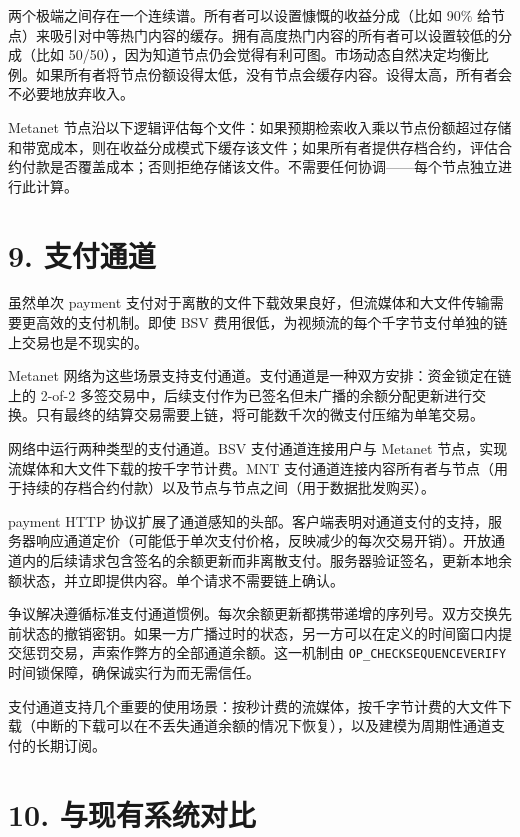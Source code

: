 \documentclass[11pt,a4paper]{article}
\begin{document}
两个极端之间存在一个连续谱。所有者可以设置慷慨的收益分成（比如 90\% 给节点）来吸引对中等热门内容的缓存。拥有高度热门内容的所有者可以设置较低的分成（比如 50/50），因为知道节点仍会觉得有利可图。市场动态自然决定均衡比例。如果所有者将节点份额设得太低，没有节点会缓存内容。设得太高，所有者会不必要地放弃收入。

Metanet 节点沿以下逻辑评估每个文件：如果预期检索收入乘以节点份额超过存储和带宽成本，则在收益分成模式下缓存该文件；如果所有者提供存档合约，评估合约付款是否覆盖成本；否则拒绝存储该文件。不需要任何协调——每个节点独立进行此计算。

\section{9. 支付通道}

虽然单次 payment 支付对于离散的文件下载效果良好，但流媒体和大文件传输需要更高效的支付机制。即使 BSV 费用很低，为视频流的每个千字节支付单独的链上交易也是不现实的。

Metanet 网络为这些场景支持支付通道。支付通道是一种双方安排：资金锁定在链上的 2-of-2 多签交易中，后续支付作为已签名但未广播的余额分配更新进行交换。只有最终的结算交易需要上链，将可能数千次的微支付压缩为单笔交易。

网络中运行两种类型的支付通道。BSV 支付通道连接用户与 Metanet 节点，实现流媒体和大文件下载的按千字节计费。MNT 支付通道连接内容所有者与节点（用于持续的存档合约付款）以及节点与节点之间（用于数据批发购买）。

payment HTTP 协议扩展了通道感知的头部。客户端表明对通道支付的支持，服务器响应通道定价（可能低于单次支付价格，反映减少的每次交易开销）。开放通道内的后续请求包含签名的余额更新而非离散支付。服务器验证签名，更新本地余额状态，并立即提供内容。单个请求不需要链上确认。

争议解决遵循标准支付通道惯例。每次余额更新都携带递增的序列号。双方交换先前状态的撤销密钥。如果一方广播过时的状态，另一方可以在定义的时间窗口内提交惩罚交易，声索作弊方的全部通道余额。这一机制由 \texttt{OP\_CHECKSEQUENCEVERIFY} 时间锁保障，确保诚实行为而无需信任。

支付通道支持几个重要的使用场景：按秒计费的流媒体，按千字节计费的大文件下载（中断的下载可以在不丢失通道余额的情况下恢复），以及建模为周期性通道支付的长期订阅。

\section{10. 与现有系统对比}
\end{document}
